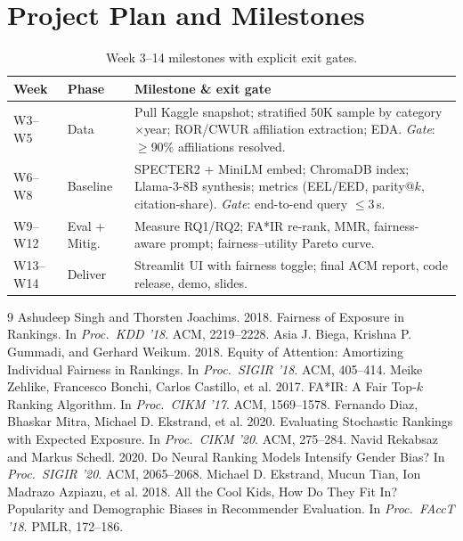 \documentclass[sigconf]{acmart}
\begin{document}
\section{Project Plan and Milestones}

\begin{table}[h]
  \caption{Week 3--14 milestones with explicit exit gates.}
  \label{tab:plan}
  \footnotesize
  \begin{tabular}{@{}p{0.42in}p{0.55in}p{1.76in}@{}}
    \toprule
    \textbf{Week} & \textbf{Phase} & \textbf{Milestone \& exit gate} \\
    \midrule
    W3--W5   & Data        & Pull Kaggle snapshot; stratified 50K sample by category$\times$year; ROR/CWUR affiliation extraction; EDA. \emph{Gate}: $\geq$90\% affiliations resolved. \\
    W6--W8   & Baseline    & SPECTER2 + MiniLM embed; ChromaDB index; Llama-3-8B synthesis; metrics (EEL/EED, parity@$k$, citation-share). \emph{Gate}: end-to-end query $\leq$3\,s. \\
    W9--W12  & Eval + Mitig.& Measure RQ1/RQ2; FA*IR re-rank, MMR, fairness-aware prompt; fairness--utility Pareto curve. \\
    W13--W14 & Deliver     & Streamlit UI with fairness toggle; final ACM report, code release, demo, slides. \\
    \bottomrule
  \end{tabular}
\end{table}

\begin{thebibliography}{9}\footnotesize
\setlength{\itemsep}{0pt}\setlength{\parskip}{0pt}
 Ashudeep Singh and Thorsten Joachims. 2018. Fairness of Exposure in Rankings. In \emph{Proc.\ KDD '18}. ACM, 2219--2228.
 Asia J. Biega, Krishna P. Gummadi, and Gerhard Weikum. 2018. Equity of Attention: Amortizing Individual Fairness in Rankings. In \emph{Proc.\ SIGIR '18}. ACM, 405--414.
 Meike Zehlike, Francesco Bonchi, Carlos Castillo, et al. 2017. FA*IR: A Fair Top-$k$ Ranking Algorithm. In \emph{Proc.\ CIKM '17}. ACM, 1569--1578.
 Fernando Diaz, Bhaskar Mitra, Michael D. Ekstrand, et al. 2020. Evaluating Stochastic Rankings with Expected Exposure. In \emph{Proc.\ CIKM '20}. ACM, 275--284.
 Navid Rekabsaz and Markus Schedl. 2020. Do Neural Ranking Models Intensify Gender Bias? In \emph{Proc.\ SIGIR '20}. ACM, 2065--2068.
 Michael D. Ekstrand, Mucun Tian, Ion Madrazo Azpiazu, et al. 2018. All the Cool Kids, How Do They Fit In? Popularity and Demographic Biases in Recommender Evaluation. In \emph{Proc.\ FAccT '18}. PMLR, 172--186.
\end{thebibliography}
\end{document}
